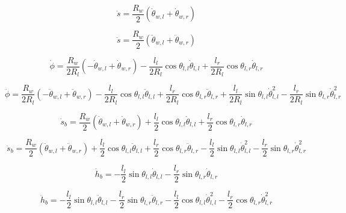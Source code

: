 \begin{equation}
\dot{s} = \frac{R_w}{2}(\dot{\theta}_{w,l} + \dot{\theta}_{w,r}) 
\label{eq:ds}
\end{equation}

\begin{equation}
\ddot{s} = \frac{R_w}{2}(\ddot{\theta}_{w,l} + \ddot{\theta}_{w,r}) 
\label{eq:dds}
\end{equation}

\begin{equation}
\dot{\phi} = \frac{R_w}{2R_l}(-\dot{\theta}_{w,l} + \dot{\theta}_{w,r}) - \frac{l_l}{2R_l}\cos\theta_{l,l}\dot{\theta}_{l,l} + \frac{l_r}{2R_l}\cos\theta_{l,r}\dot{\theta}_{l,r} 
\end{equation}

\begin{equation}
\ddot{\phi} = \frac{R_w}{2R_l}(-\ddot{\theta}_{w,l} + \ddot{\theta}_{w,r}) - \frac{l_l}{2R_l}\cos\theta_{l,l}\ddot{\theta}_{l,l} + \frac{l_r}{2R_l}\cos\theta_{l,r}\ddot{\theta}_{l,r} + \frac{l_l}{2R_l}\sin\theta_{l,l}\dot{\theta}_{l,l}^2 - \frac{l_r}{2R_l}\sin\theta_{l,r}\dot{\theta}_{l,r}^2 
\end{equation}

\begin{equation}
\dot{s}_b = \frac{R_w}{2}(\dot{\theta}_{w,l} + \dot{\theta}_{w,r}) + \frac{l_l}{2}\cos\theta_{l,l}\dot{\theta}_{l,l} + \frac{l_r}{2}\cos\theta_{l,r}\dot{\theta}_{l,r} 
\end{equation}

\begin{equation}
\ddot{s}_b = \frac{R_w}{2}(\ddot{\theta}_{w,l} + \ddot{\theta}_{w,r}) + \frac{l_l}{2}\cos\theta_{l,l}\ddot{\theta}_{l,l} + \frac{l_r}{2}\cos\theta_{l,r}\ddot{\theta}_{l,r} - \frac{l_l}{2}\sin\theta_{l,l}\dot{\theta}_{l,l}^2 - \frac{l_r}{2}\sin\theta_{l,r}\dot{\theta}_{l,r}^2 
\end{equation}

\begin{equation}
\dot{h}_b = -\frac{l_l}{2}\sin\theta_{l,l}\dot{\theta}_{l,l} - \frac{l_r}{2}\sin\theta_{l,r}\dot{\theta}_{l,r} 
\end{equation}

\begin{equation}
\ddot{h}_b = -\frac{l_l}{2}\sin\theta_{l,l}\ddot{\theta}_{l,l} - \frac{l_r}{2}\sin\theta_{l,r}\ddot{\theta}_{l,r} - \frac{l_l}{2}\cos\theta_{l,l}\dot{\theta}_{l,l}^2 - \frac{l_r}{2}\cos\theta_{l,r}\dot{\theta}_{l,r}^2 
\end{equation}


